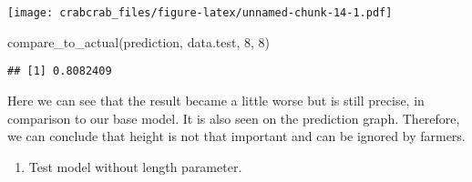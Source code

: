 \documentclass[
]{article}
\newenvironment{Shaded}{\begin{snugshade}}{\end{snugshade}}
\newcommand{\AttributeTok}[1]{\textcolor[rgb]{0.77,0.63,0.00}{#1}}
\newcommand{\DecValTok}[1]{\textcolor[rgb]{0.00,0.00,0.81}{#1}}
\newcommand{\FunctionTok}[1]{\textcolor[rgb]{0.00,0.00,0.00}{#1}}
\newcommand{\NormalTok}[1]{#1}
\newcommand{\OtherTok}[1]{\textcolor[rgb]{0.56,0.35,0.01}{#1}}
\newcommand{\SpecialCharTok}[1]{\textcolor[rgb]{0.00,0.00,0.00}{#1}}
\newcommand{\StringTok}[1]{\textcolor[rgb]{0.31,0.60,0.02}{#1}}
\providecommand{\tightlist}{%
  \setlength{\itemsep}{0pt}\setlength{\parskip}{0pt}}
\begin{document}
\begin{Shaded}
\end{Shaded}

\texttt{[image: crabcrab\_files/figure-latex/unnamed-chunk-14-1.pdf]}

\begin{Shaded}
\begin{Highlighting}[]
\FunctionTok{compare\_to\_actual}\NormalTok{(prediction, data.test, }\DecValTok{8}\NormalTok{, }\DecValTok{8}\NormalTok{)}
\end{Highlighting}
\end{Shaded}

\begin{verbatim}
## [1] 0.8082409
\end{verbatim}

Here we can see that the result became a little worse but is still
precise, in comparison to our base model. It is also seen on the
prediction graph. Therefore, we can conclude that height is not that
important and can be ignored by farmers.

\begin{enumerate}
\def\labelenumi{\arabic{enumi}.}
\setcounter{enumi}{2}
\tightlist
\item
  Test model without length parameter.
\end{enumerate}
\end{document}
